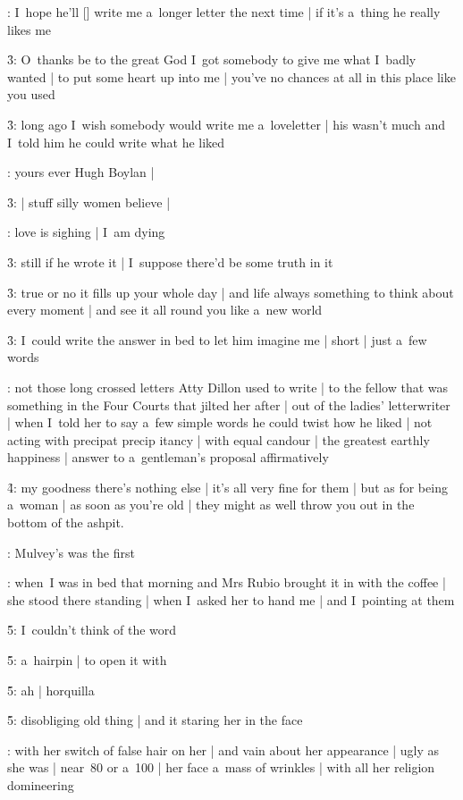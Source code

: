 :
I~hope he'll [\boylan] write me a~longer letter the next time |
if it's a~thing he really likes me

\f3:
O~thanks be to the great God I~got somebody to give me what I~badly wanted |
to put some heart up into me |
you've no chances at all in this place like you used

\f3:
long ago I~wish somebody would write me a~loveletter |
his wasn't much and I~told him he could write what he liked

:
yours ever Hugh Boylan |

\f3:
 |
stuff silly women believe |

:
love is sighing |
I~am dying

\f3:
still if he wrote it |
I~suppose there'd be some truth in it

\f3:
true or no it fills up your whole day |
and life always something to think about every moment |
and see it all round you like a~new world

\f3:
I~could write the answer in bed to let him imagine me |
short |
just a~few words

:
not those long crossed letters Atty Dillon used to write |
to the fellow that was something in the Four Courts that jilted her after |
out of the ladies' letterwriter |
when I~told her to say a~few simple words
he could twist how he liked |
not acting with precipat precip itancy |
with equal candour |
the greatest earthly happiness |
answer to a~gentleman's proposal affirmatively

\f4:
my goodness there's nothing else |
it's all very fine for them |
but as for being a~woman |
as soon as you're old |
they might as well throw you out in the bottom of the ashpit.




:
Mulvey's was the first

:
when~I was in bed that morning and Mrs Rubio brought it in with the coffee |
she stood there standing |
when I~asked her to hand me |
and I~pointing at them

\f5:
I~couldn't think of the word

\f5:
a~hairpin |
to open it with

\f5:
ah |
horquilla

\f5:
disobliging old thing |
and it staring her in the face

:
with her switch of false hair on her |
and vain about her appearance |
ugly as she was |
near~80 or a~100 |
her face a~mass of wrinkles |
with all her religion domineering

